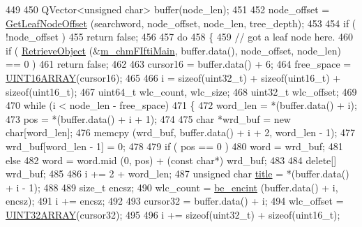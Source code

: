 \begin{DoxyCode}
449 
450     QVector<unsigned char> buffer(node\_len);
451 
452     node\_offset = \hyperlink{classLCHMFileImpl_accf081c4ea0e7ec303b969d53d82593a}{GetLeafNodeOffset} (searchword, node\_offset, node\_len, tree\_depth);
453 
454     \textcolor{keywordflow}{if} ( !node\_offset )
455         \textcolor{keywordflow}{return} \textcolor{keyword}{false};
456 
457     \textcolor{keywordflow}{do}
458     \{
459         \textcolor{comment}{// got a leaf node here.}
460         \textcolor{keywordflow}{if} ( \hyperlink{classLCHMFileImpl_a8535dce5eb8f22161ecf3510fde8aa4e}{RetrieveObject} (&\hyperlink{classLCHMFileImpl_aff4c9c66f19b11205e4cbdabc7b2d8aa}{m\_chmFIftiMain}, buffer.data(), node\_offset, 
      node\_len) == 0 )
461             \textcolor{keywordflow}{return} \textcolor{keyword}{false};
462 
463         cursor16 = buffer.data() + 6;
464         free\_space = \hyperlink{bitfiddle_8h_a4cdadd3f542d83f288d0b415c397fbb9}{UINT16ARRAY}(cursor16);
465 
466         i = \textcolor{keyword}{sizeof}(uint32\_t) + \textcolor{keyword}{sizeof}(uint16\_t) + \textcolor{keyword}{sizeof}(uint16\_t);
467         uint64\_t wlc\_count, wlc\_size;
468         uint32\_t wlc\_offset;
469 
470         \textcolor{keywordflow}{while} (i < node\_len - free\_space)
471         \{
472             word\_len = *(buffer.data() + i);
473             pos = *(buffer.data() + i + 1);
474 
475             \textcolor{keywordtype}{char} *wrd\_buf = \textcolor{keyword}{new} \textcolor{keywordtype}{char}[word\_len];
476             memcpy (wrd\_buf, buffer.data() + i + 2, word\_len - 1);
477             wrd\_buf[word\_len - 1] = 0;
478 
479             \textcolor{keywordflow}{if} ( pos == 0 )
480                 word = wrd\_buf;
481             \textcolor{keywordflow}{else}
482                 word = word.mid (0, pos) + (\textcolor{keyword}{const} \textcolor{keywordtype}{char}*) wrd\_buf;
483 
484             \textcolor{keyword}{delete}[] wrd\_buf;
485 
486             i += 2 + word\_len;
487             \textcolor{keywordtype}{unsigned} \textcolor{keywordtype}{char} \hyperlink{classLCHMFileImpl_ad4d900f2d705ecd494289de810318b5c}{title} = *(buffer.data() + i - 1);
488 
489             \textcolor{keywordtype}{size\_t} encsz;
490             wlc\_count = \hyperlink{bitfiddle_8h_ac5be5a4138a59661d9c6c46ac85b0ec8}{be\_encint} (buffer.data() + i, encsz);
491             i += encsz;
492         
493             cursor32 = buffer.data() + i;
494             wlc\_offset = \hyperlink{bitfiddle_8h_a09e5156ae22f7b3ea6e8fe0f94084390}{UINT32ARRAY}(cursor32);
495 
496             i += \textcolor{keyword}{sizeof}(uint32\_t) + \textcolor{keyword}{sizeof}(uint16\_t);

\end{DoxyCode}
